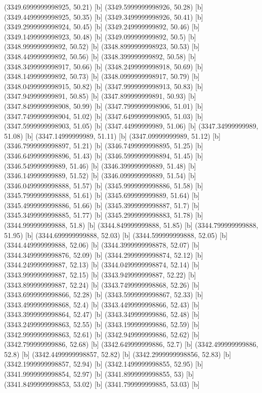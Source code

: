 {{{(3349.6999999998925, 50.21) [b] 
(3349.5999999998926, 50.28) [b] 
(3349.4499999998925, 50.35) [b] 
(3349.3499999998926, 50.41) [b] 
(3349.2999999998924, 50.45) [b] 
(3349.249999999892, 50.46) [b] 
(3349.1499999998923, 50.48) [b] 
(3349.099999999892, 50.5) [b] 
(3348.999999999892, 50.52) [b] 
(3348.8999999998923, 50.53) [b] 
(3348.449999999892, 50.56) [b] 
(3348.399999999892, 50.58) [b] 
(3348.3499999998917, 50.66) [b] 
(3348.2499999998918, 50.69) [b] 
(3348.149999999892, 50.73) [b] 
(3348.0999999998917, 50.79) [b] 
(3348.0499999998915, 50.82) [b] 
(3347.9999999998913, 50.83) [b] 
(3347.949999999891, 50.85) [b] 
(3347.899999999891, 50.93) [b] 
(3347.8499999998908, 50.99) [b] 
(3347.7999999998906, 51.01) [b] 
(3347.7499999998904, 51.02) [b] 
(3347.6499999998905, 51.03) [b] 
(3347.5999999998903, 51.05) [b] 
(3347.44999999989, 51.06) [b] 
(3347.34999999989, 51.08) [b] 
(3347.14999999989, 51.11) [b] 
(3347.09999999989, 51.12) [b] 
(3346.7999999998897, 51.21) [b] 
(3346.7499999998895, 51.25) [b] 
(3346.6499999998896, 51.43) [b] 
(3346.5999999998894, 51.45) [b] 
(3346.549999999889, 51.46) [b] 
(3346.399999999889, 51.48) [b] 
(3346.149999999889, 51.52) [b] 
(3346.099999999889, 51.54) [b] 
(3346.0499999998888, 51.57) [b] 
(3345.9999999998886, 51.58) [b] 
(3345.7999999998888, 51.61) [b] 
(3345.699999999889, 51.64) [b] 
(3345.4999999998886, 51.66) [b] 
(3345.3999999998887, 51.7) [b] 
(3345.3499999998885, 51.77) [b] 
(3345.2999999998883, 51.78) [b] 
(3344.999999999888, 51.8) [b] 
(3344.849999999888, 51.85) [b] 
(3344.799999999888, 51.95) [b] 
(3344.699999999888, 52.03) [b] 
(3344.599999999888, 52.05) [b] 
(3344.449999999888, 52.06) [b] 
(3344.3999999998878, 52.07) [b] 
(3344.3499999998876, 52.09) [b] 
(3344.2999999998874, 52.12) [b] 
(3344.249999999887, 52.13) [b] 
(3344.0499999998874, 52.14) [b] 
(3343.999999999887, 52.15) [b] 
(3343.949999999887, 52.22) [b] 
(3343.899999999887, 52.24) [b] 
(3343.7499999998868, 52.26) [b] 
(3343.6999999998866, 52.28) [b] 
(3343.5999999998867, 52.33) [b] 
(3343.4999999998868, 52.4) [b] 
(3343.4499999998866, 52.43) [b] 
(3343.3999999998864, 52.47) [b] 
(3343.349999999886, 52.48) [b] 
(3343.2499999998863, 52.55) [b] 
(3343.199999999886, 52.59) [b] 
(3342.9999999998863, 52.61) [b] 
(3342.949999999886, 52.62) [b] 
(3342.799999999886, 52.68) [b] 
(3342.649999999886, 52.7) [b] 
(3342.499999999886, 52.8) [b] 
(3342.4499999998857, 52.82) [b] 
(3342.2999999998856, 52.83) [b] 
(3342.1999999998857, 52.94) [b] 
(3342.1499999998855, 52.95) [b] 
(3341.9999999998854, 52.97) [b] 
(3341.8999999998855, 53) [b] 
(3341.8499999998853, 53.02) [b] 
(3341.799999999885, 53.03) [b] 
}}}
